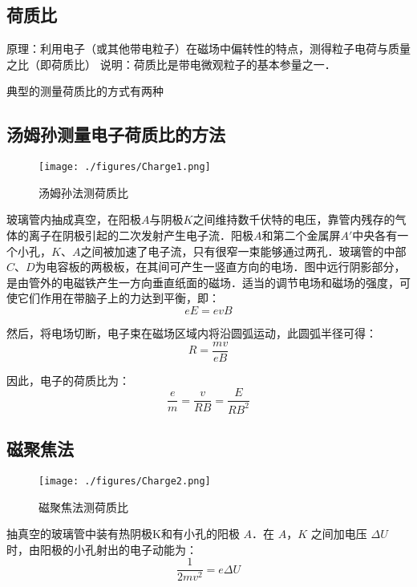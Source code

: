 
\subsection{荷质比}
原理：利用电子（或其他带电粒子）在磁场中偏转性的特点，测得粒子电荷与质量之比（即荷质比）
说明：荷质比是带电微观粒子的基本参量之一．

典型的测量荷质比的方式有两种

\subsection{汤姆孙测量电子荷质比的方法}

\begin{figure}[ht]
\centering
\texttt{[image: ./figures/Charge1.png]}
\caption{汤姆孙法测荷质比} \label{Charge_fig1}
\end{figure}

玻璃管内抽成真空，在阳极$A$与阴极$K$之间维持数千伏特的电压，靠管内残存的气体的离子在阴极引起的二次发射产生电子流．阳极$A$和第二个金属屏$A'$中央各有一个小孔，$K$、$A$之间被加速了电子流，只有很窄一束能够通过两孔．玻璃管的中部$C$、$D$为电容板的两极板，在其间可产生一竖直方向的电场．图中远行阴影部分，是由管外的电磁铁产生一方向垂直纸面的磁场．适当的调节电场和磁场的强度，可使它们作用在带脑子上的力达到平衡，即：
\begin{equation}
eE=evB
\end{equation}

然后，将电场切断，电子束在磁场区域内将沿圆弧运动，此圆弧半径可得：
\begin{equation}
R=\frac {mv}{eB}
\end{equation}

因此，电子的荷质比为：
\begin{equation}
\frac{e}{m}=\frac{v}{RB}=\frac {E}{RB^2}
\end{equation}


\subsection{磁聚焦法}

\begin{figure}[ht]
\centering
\texttt{[image: ./figures/Charge2.png]}
\caption{磁聚焦法测荷质比} \label{Charge_fig2}
\end{figure}

抽真空的玻璃管中装有热阴极K和有小孔的阳极 $A$．在 $A$，$K$ 之间加电压 $\Delta U$ 时，由阳极的小孔射出的电子动能为：
\begin{equation}
\frac{1}{2mv^2}=e\Delta U
\end{equation}

